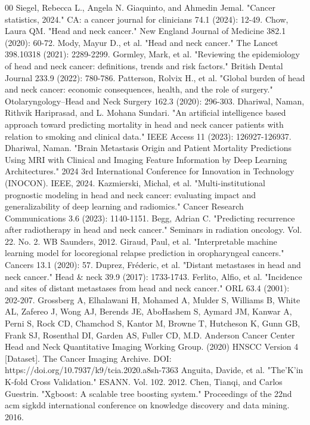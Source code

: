 \documentclass[conference]{IEEEtran}
\begin{document}
\begin{thebibliography}{00}
 Siegel, Rebecca L., Angela N. Giaquinto, and Ahmedin Jemal. "Cancer statistics, 2024." CA: a cancer journal for clinicians 74.1 (2024): 12-49.
 Chow, Laura QM. "Head and neck cancer." New England Journal of Medicine 382.1 (2020): 60-72.
 Mody, Mayur D., et al. "Head and neck cancer." The Lancet 398.10318 (2021): 2289-2299.
 Gormley, Mark, et al. "Reviewing the epidemiology of head and neck cancer: definitions, trends and risk factors." British Dental Journal 233.9 (2022): 780-786.
 Patterson, Rolvix H., et al. "Global burden of head and neck cancer: economic consequences, health, and the role of surgery." Otolaryngology–Head and Neck Surgery 162.3 (2020): 296-303.
 Dhariwal, Naman, Rithvik Hariprasad, and L. Mohana Sundari. "An artificial intelligence based approach toward predicting mortality in head and neck cancer patients with relation to smoking and clinical data." IEEE Access 11 (2023): 126927-126937.
 Dhariwal, Naman. "Brain Metastasis Origin and Patient Mortality Predictions Using MRI with Clinical and Imaging Feature Information by Deep Learning Architectures." 2024 3rd International Conference for Innovation in Technology (INOCON). IEEE, 2024.
 Kazmierski, Michal, et al. "Multi-institutional prognostic modeling in head and neck cancer: evaluating impact and generalizability of deep learning and radiomics." Cancer Research Communications 3.6 (2023): 1140-1151.
 Begg, Adrian C. "Predicting recurrence after radiotherapy in head and neck cancer." Seminars in radiation oncology. Vol. 22. No. 2. WB Saunders, 2012.
 Giraud, Paul, et al. "Interpretable machine learning model for locoregional relapse prediction in oropharyngeal cancers." Cancers 13.1 (2020): 57.
 Duprez, Fréderic, et al. "Distant metastases in head and neck cancer." Head \& neck 39.9 (2017): 1733-1743.
 Ferlito, Alfio, et al. "Incidence and sites of distant metastases from head and neck cancer." ORL 63.4 (2001): 202-207.
 Grossberg A, Elhalawani H, Mohamed A, Mulder S, Williams B, White AL, Zafereo J, Wong AJ, Berends JE, AboHashem S, Aymard JM, Kanwar A, Perni S, Rock CD, Chamchod S, Kantor M, Browne T, Hutcheson K, Gunn GB, Frank SJ, Rosenthal DI, Garden AS, Fuller CD, M.D. Anderson Cancer Center Head and Neck Quantitative Imaging Working Group. (2020) HNSCC Version 4 [Dataset]. The Cancer Imaging Archive. DOI: https://doi.org/10.7937/k9/tcia.2020.a8sh-7363
 Anguita, Davide, et al. "The'K'in K-fold Cross Validation." ESANN. Vol. 102. 2012.
 Chen, Tianqi, and Carlos Guestrin. "Xgboost: A scalable tree boosting system." Proceedings of the 22nd acm sigkdd international conference on knowledge discovery and data mining. 2016.

\end{thebibliography}
\end{document}

